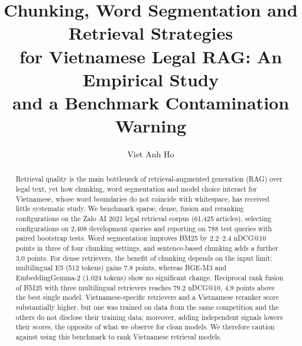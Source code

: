 \documentclass{ws-vjcs}
\begin{document}


\title{Chunking, Word Segmentation and Retrieval Strategies\\
for Vietnamese Legal RAG: An Empirical Study\\
and a Benchmark Contamination Warning}

\author{Viet Anh Ho}

\address{Faculty of Information Technology,\\
Ho Chi Minh City University of Technology and Engineering,\\
Ho Chi Minh City, Vietnam\\
hovietanh147@gmail.com}

\maketitle


\begin{abstract}
Retrieval quality is the main bottleneck of retrieval-augmented generation (RAG) over legal text, yet how chunking, word segmentation and model choice interact for Vietnamese, whose word boundaries do not coincide with whitespace, has received little systematic study. We benchmark sparse, dense, fusion and reranking configurations on the Zalo AI 2021 legal retrieval corpus (61,425 articles), selecting configurations on 2,408 development queries and reporting on 788 test queries with paired bootstrap tests. Word segmentation improves BM25 by 2.2--2.4 nDCG@10 points in three of four chunking settings, and sentence-based chunking adds a further 3.0 points. For dense retrievers, the benefit of chunking depends on the input limit: multilingual E5 (512 tokens) gains 7.8 points, whereas BGE-M3 and EmbeddingGemma-2 (1,024 tokens) show no significant change. Reciprocal rank fusion of BM25 with three multilingual retrievers reaches 79.2 nDCG@10, 4.9 points above the best single model. Vietnamese-specific retrievers and a Vietnamese reranker score substantially higher, but one was trained on data from the same competition and the others do not disclose their training data; moreover, adding independent signals lowers their scores, the opposite of what we observe for clean models. We therefore caution against using this benchmark to rank Vietnamese retrieval models.

\end{abstract}
\end{document}
